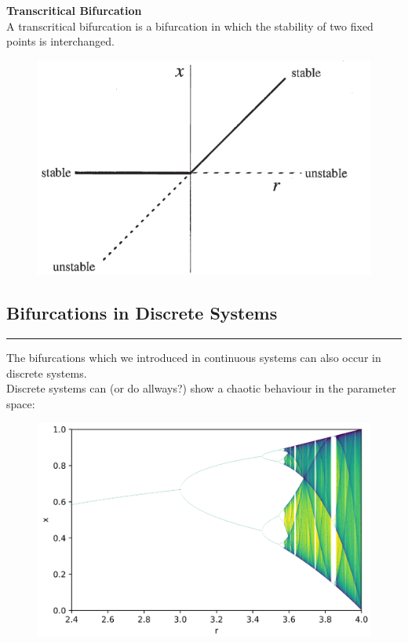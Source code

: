 \textbf{Transcritical Bifurcation}\\
A transcritical bifurcation is a bifurcation in which the stability of two fixed points is interchanged.
\begin{figure}[H]
  \centering
  \includegraphics[width=.5\linewidth]{Pics/9.4.png}
\end{figure}

\subsection{Bifurcations in Discrete Systems}
\noindent\rule[\linienAbstand]{\linewidth}{\linienDicke}
The bifurcations which we introduced in continuous systems can also occur in discrete systems.\\
Discrete systems can (or do allways?) show a chaotic behaviour in the parameter space:

\begin{figure}[H]
  \centering
  \includegraphics[width=.9\linewidth]{Pics/9.5.png}
\end{figure}

